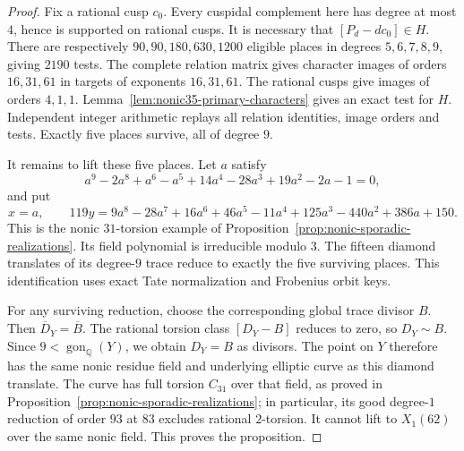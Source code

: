 \begin{proof}
Fix a rational cusp $c_0$.
Every cuspidal complement here has degree at most $4$, hence is
supported on rational cusps. It is necessary that $[P_d-dc_0]\in H$.
There are respectively $90,90,180,630,1200$ eligible places in
degrees $5,6,7,8,9$, giving $2190$ tests.
The complete relation matrix gives character images of orders
$16,31,61$ in targets of exponents $16,31,61$.
The rational cusps give images of orders $4,1,1$.
Lemma~\ref{lem:nonic35-primary-characters} gives an exact test for $H$.
Independent integer arithmetic replays all relation identities,
image orders and tests. Exactly five places survive, all of degree $9$.

It remains to lift these five places. Let $a$ satisfy
\[
 a^9-2a^8+a^6-a^5+14a^4-28a^3+19a^2-2a-1=0,
\]
and put
\[
 x=a,\qquad
 119y=9a^8-28a^7+16a^6+46a^5-11a^4+125a^3-440a^2+386a+150.
\]
This is the nonic $31$-torsion example of
Proposition~\ref{prop:nonic-sporadic-realizations}.
Its field polynomial is irreducible modulo $3$.
The fifteen diamond translates of its degree-$9$ trace reduce to
exactly the five surviving places. This identification uses exact
Tate normalization and Frobenius orbit keys.

For any surviving reduction, choose the corresponding global
trace divisor $B$. Then $\overline D_Y=\overline B$.
The rational torsion class $[D_Y-B]$ reduces to zero, so
$D_Y\sim B$. Since $9<\operatorname{gon}_{\mathbb Q}(Y)$, we obtain
$D_Y=B$ as divisors.
The point on $Y$ therefore has the same nonic residue field and
underlying elliptic curve as this diamond translate.
The curve has full torsion $C_{31}$ over that field, as proved in
Proposition~\ref{prop:nonic-sporadic-realizations}; in particular,
its good degree-$1$ reduction of order $93$ at $83$ excludes
rational $2$-torsion.
It cannot lift to $X_1(62)$ over the same nonic field.
This proves the proposition.
\end{proof}
